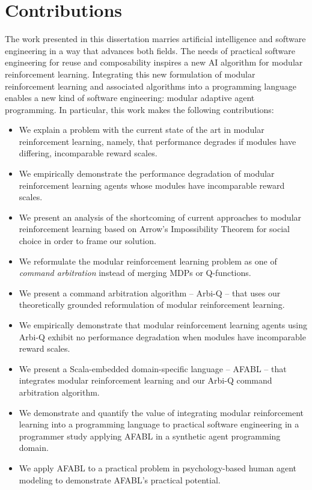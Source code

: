 \section{Contributions}

The work presented in this dissertation marries artificial intelligence and software engineering in a way that advances both fields. The needs of practical software engineering for reuse and composability inspires a new AI algorithm for modular reinforcement learning. Integrating this new formulation of modular reinforcement learning and associated algorithms into a programming language enables a new kind of software engineering: modular adaptive agent programming. In particular, this work makes the following contributions:

\begin{itemize}
\item We explain a problem with the current state of the art in modular reinforcement learning, namely, that performance degrades if modules have differing, incomparable reward scales. 
\item We empirically demonstrate the performance degradation of modular reinforcement learning agents whose modules have incomparable reward scales.
\item We present an analysis of the shortcoming of current approaches to modular reinforcement learning based on Arrow's Impossibility Theorem for social choice in order to frame our solution.
\item We reformulate the modular reinforcement learning problem as one of {\it command arbitration} instead of merging MDPs or Q-functions.
\item We present a command arbitration algorithm -- Arbi-Q -- that uses our theoretically grounded reformulation of modular reinforcement learning.
\item We empirically demonstrate that modular reinforcement learning agents using Arbi-Q exhibit no performance degradation when modules have incomparable reward scales.
\item We present a Scala-embedded domain-specific language -- AFABL -- that integrates modular reinforcement learning and our Arbi-Q command arbitration algorithm.
\item We demonstrate and quantify the value of integrating modular reinforcement learning into a programming language to practical software engineering in a programmer study applying AFABL in a synthetic agent programming domain.
\item We apply AFABL to a practical problem in psychology-based human agent modeling to demonstrate AFABL's practical potential.
\end{itemize}

